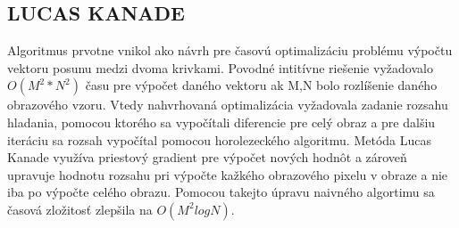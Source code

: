 \subsection{LUCAS KANADE}
Algoritmus prvotne vnikol ako návrh pre časovú optimalizáciu problému výpočtu vektoru posunu medzi dvoma krivkami. Povodné intitívne riešenie vyžadovalo \begin{math} O(M^2 * N^2) \end{math} času pre výpočet daného vektoru ak M,N bolo rozlíšenie daného obrazového vzoru. Vtedy nahvrhovaná optimalizácia vyžadovala zadanie rozsahu hladania, pomocou ktorého sa vypočítali diferencie pre celý obraz a pre dalšiu iteráciu sa rozsah vypočítal pomocou horolezeckého algoritmu. Metóda Lucas Kanade využíva priestový gradient pre výpočet nových hodnôt a zároveň upravuje hodnotu rozsahu pri výpočte kažkého obrazového pixelu v obraze a nie iba po výpočte celého obrazu. Pomocou takejto úpravu naivného algortimu sa časová zložitosť zlepšila na \begin{math} O(M^2 log N) \end{math}\cite{lucas-kanade}.

